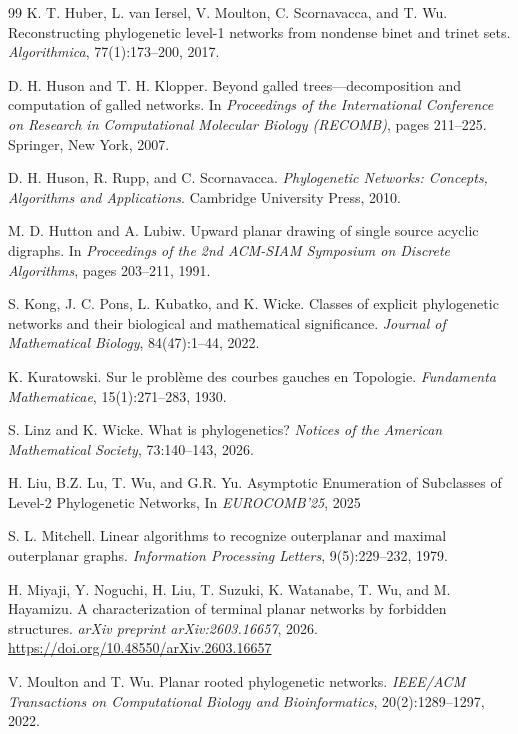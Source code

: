 \documentclass[pdflatex,sn-mathphys-num]{sn-jnl}
\theoremstyle{thmstyleone}%
\theoremstyle{thmstyletwo}%
\theoremstyle{thmstylethree}%
\begin{document}
\begin{thebibliography}{99}
K. T. Huber, L. van Iersel, V. Moulton, C. Scornavacca, and T. Wu.
Reconstructing phylogenetic level-1 networks from nondense binet and trinet sets.
\textit{Algorithmica},
77(1):173--200, 2017.

D. H. Huson and T. H. Klopper.
Beyond galled trees---decomposition and computation of galled networks.
In \textit{Proceedings of the International Conference on Research in Computational Molecular Biology (RECOMB)},
pages 211--225.
Springer, New York, 2007.

D. H. Huson, R. Rupp, and C. Scornavacca.
\textit{Phylogenetic Networks: Concepts, Algorithms and Applications}.
Cambridge University Press, 2010.

M. D. Hutton and A. Lubiw.
Upward planar drawing of single source acyclic digraphs.
In \textit{Proceedings of the 2nd ACM-SIAM Symposium on Discrete Algorithms},
pages 203--211, 1991.

 S. Kong, J. C. Pons, L. Kubatko, and K. Wicke. Classes of explicit phylogenetic networks and their biological and mathematical significance. \textit{Journal of Mathematical Biology}, 84(47):1--44, 2022.


K. Kuratowski.
Sur le probl{\`e}me des courbes gauches en {T}opologie.
\textit{Fundamenta Mathematicae},
15(1):271--283, 1930.

 S. Linz and K. Wicke. What is phylogenetics? \textit{Notices of the American Mathematical Society}, 73:140--143, 2026.

H. Liu, B.Z. Lu, T. Wu, and G.R. Yu.
Asymptotic Enumeration of Subclasses of Level-2 Phylogenetic Networks,
In \textit{EUROCOMB'25}, 2025


S. L. Mitchell.
Linear algorithms to recognize outerplanar and maximal outerplanar graphs.
\textit{Information Processing Letters},
9(5):229--232, 1979.



H. Miyaji, Y. Noguchi, H. Liu, T. Suzuki, K. Watanabe, T. Wu, and M. Hayamizu.
A characterization of terminal planar networks by forbidden structures.
\textit{arXiv preprint arXiv:2603.16657}, 2026.
\url{https://doi.org/10.48550/arXiv.2603.16657}

V. Moulton and T. Wu.
Planar rooted phylogenetic networks.
\textit{IEEE/ACM Transactions on Computational Biology and Bioinformatics},
20(2):1289--1297, 2022.





\end{thebibliography}
\end{document}
